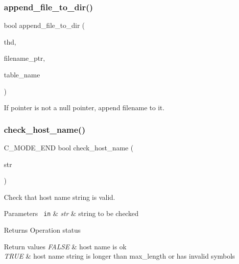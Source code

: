 \subsubsection{\texorpdfstring{append\+\_\+file\+\_\+to\+\_\+dir()}{append\_file\_to\_dir()}}
{\footnotesize\ttfamily bool append\+\_\+file\+\_\+to\+\_\+dir (\begin{DoxyParamCaption}\item[{T\+HD $\ast$}]{thd,  }\item[{const char $\ast$$\ast$}]{filename\+\_\+ptr,  }\item[{const char $\ast$}]{table\+\_\+name }\end{DoxyParamCaption})}

If pointer is not a null pointer, append filename to it. \mbox{\label{group__Runtime__Environment_ga83c28ce3e415fe976a0d40cc4b4eef81}} 
\subsubsection{\texorpdfstring{check\+\_\+host\+\_\+name()}{check\_host\_name()}}
{\footnotesize\ttfamily C\+\_\+\+M\+O\+D\+E\+\_\+\+E\+ND bool check\+\_\+host\+\_\+name (\begin{DoxyParamCaption}\item[{const L\+E\+X\+\_\+\+C\+S\+T\+R\+I\+NG \&}]{str }\end{DoxyParamCaption})}

Check that host name string is valid.


\begin{DoxyParams}[1]{Parameters}
\mbox{\texttt{ in}}  & {\em str} & string to be checked\\
\hline
\end{DoxyParams}
\begin{DoxyReturn}{Returns}
Operation status 
\end{DoxyReturn}

\begin{DoxyRetVals}{Return values}
{\em F\+A\+L\+SE} & host name is ok \\
\hline
{\em T\+R\+UE} & host name string is longer than max\+\_\+length or has invalid symbols \\
\hline
\end{DoxyRetVals}
\mbox{\label{group__Runtime__Environment_ga9a660aa2196395412bc0c5c8e7baa33a}} 
